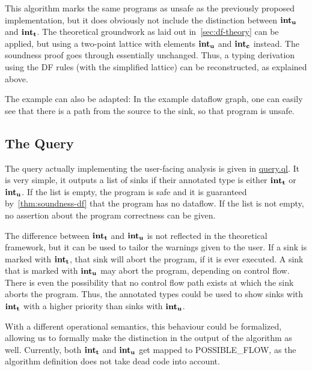 This algorithm marks the same programs as unsafe as the previously proposed implementation,
but it does obviously not include the distinction between $\textbf{int}_\textbf{u}$ and $\textbf{int}_\textbf{t}$.
The theoretical groundwork as laid out in~\autoref{sec:df-theory} can be applied,
but using a two-point lattice with elements $\textbf{int}_\textbf{u}$ and $\textbf{int}_\textbf{c}$ instead.
The soundness proof goes through essentially unchanged.
Thus, a typing derivation using the DF rules (with the simplified lattice) 
can be reconstructed, as explained above.

The example can also be adapted: In the example dataflow graph, one can easily
see that there is a path from the source to the sink, so that program is unsafe.

\subsection{The Query}
The query actually implementing the user-facing analysis is given in \hyperref[lst:query]{query.ql}.
It is very simple, it outputs a list of sinks if their annotated type is 
either $\textbf{int}_\textbf{t}$ or $\textbf{int}_\textbf{u}$.
If the list is empty, the program is safe and it is guaranteed by~\autoref{thm:soundness-df}
that the program has no dataflow.
If the list is not empty, no assertion about the program correctness can be given.

The difference between $\textbf{int}_\textbf{t}$ and $\textbf{int}_\textbf{u}$ is not reflected in the theoretical framework,
but it can be used to tailor the warnings given to the user.
If a sink is marked with $\textbf{int}_\textbf{t}$, that sink will abort the program, if it is ever
executed.
A sink that is marked with $\textbf{int}_\textbf{u}$ may abort the program, depending on control flow.
There is even the possibility that no control flow path exists at which the sink aborts 
the program.
Thus, the annotated types could be used to show sinks with $\textbf{int}_\textbf{t}$ with a higher
priority than sinks with $\textbf{int}_\textbf{u}$.

With a different operational semantics, this behaviour could be formalized, allowing us to
formally make the distinction in the output of the algorithm as well.
Currently, both $\textbf{int}_\textbf{t}$ and $\textbf{int}_\textbf{u}$ get mapped to POSSIBLE\_FLOW,
as the algorithm definition does not take dead code into account.
